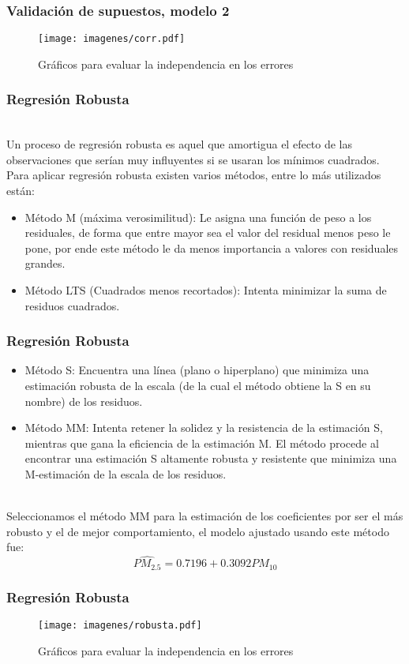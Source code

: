 \documentclass[12pt]{beamer}
\begin{document}
\begin{frame}
\frametitle{Validación de supuestos, modelo 2}
\begin{figure}[h]
  \centering
  \texttt{[image: imagenes/corr.pdf]}
  \caption{Gráficos para evaluar la independencia en los errores}\label{figura1}
\end{figure}
\end{frame}

\begin{frame}
\frametitle{Regresión Robusta}
~\\Un proceso de regresión robusta es aquel que amortigua el efecto de las observaciones que serían muy influyentes si se usaran los mínimos cuadrados.
~\\Para aplicar regresión robusta existen varios métodos, entre lo más utilizados están:
\begin{itemize}
\item Método M (máxima verosimilitud): Le asigna una función de peso a los residuales, de forma que entre mayor sea el valor del residual menos peso le pone, por ende este método le da menos importancia a valores con residuales grandes.
\item Método LTS (Cuadrados menos recortados): Intenta minimizar la suma de residuos cuadrados.
\end{itemize}
\end{frame}

\begin{frame}
\frametitle{Regresión Robusta}
\begin{itemize}
\item Método S: Encuentra una línea (plano o hiperplano) que minimiza una estimación robusta de la escala (de la cual el método obtiene la S en su nombre) de los residuos.
\item Método MM: Intenta retener la solidez y la resistencia de la estimación S, mientras que gana la eficiencia de la estimación M. El método procede al encontrar una estimación S altamente robusta y resistente que minimiza una M-estimación de la escala de los residuos.
\end{itemize}
~\\Seleccionamos el método MM para la estimación de los coeficientes por ser el más robusto y el de mejor comportamiento, el modelo ajustado usando este método fue:
$$\hat{PM_{2.5}}=0.7196+0.3092 PM_{10}$$

\end{frame}

\begin{frame}
\frametitle{Regresión Robusta}
\begin{figure}[h]
  \centering
  \texttt{[image: imagenes/robusta.pdf]}
  \caption{Gráficos para evaluar la independencia en los errores}\label{figura1}
\end{figure}
\end{frame}
\end{document}
